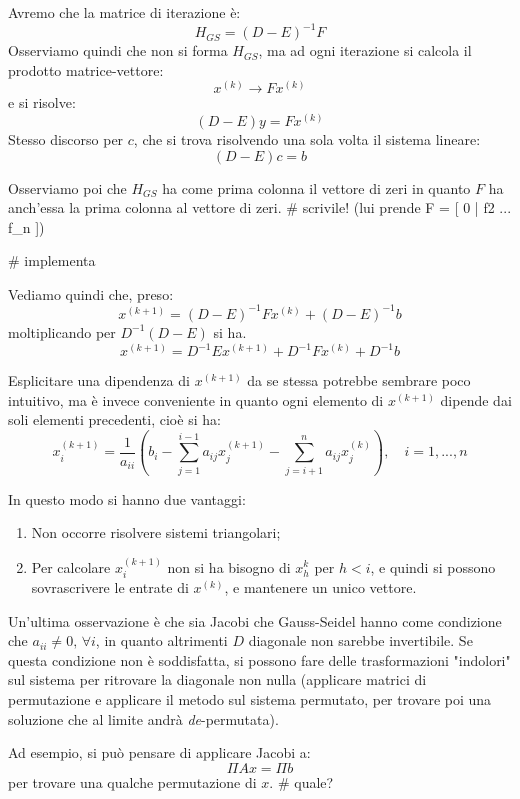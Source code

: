 \documentclass[a4paper,11pt]{article}
\begin{document}
Avremo che la matrice di iterazione è:
$$
H_{GS} = (D - E)^{-1} F
$$
Osserviamo quindi che non si forma $H_{GS}$, ma ad ogni iterazione si calcola il prodotto matrice-vettore:
$$
x^{(k)} \rightarrow F x^{(k)}
$$
e si risolve:
$$
(D - E) y = F x^{(k)}
$$
Stesso discorso per $c$, che si trova risolvendo una sola volta il sistema lineare:
$$
(D - E) c = b
$$

Osserviamo poi che $H_{GS}$ ha come prima colonna il vettore di zeri in quanto $F$ ha anch'essa la prima colonna al vettore di zeri. # scrivile! (lui prende F = [ 0 | f2 ... f_n ])

# implementa

Vediamo quindi che, preso:
$$
x^{(k + 1)} = (D - E)^{-1} F x^{(k)} + (D - E)^{-1} b
$$
moltiplicando per $D^{-1}(D - E)$ si ha.
$$
x^{(k + 1)} = D^{-1} E x^{(k + 1)} + D^{-1} F x^{(k)} + D^{-1} b
$$

Esplicitare una dipendenza di $x^{(k + 1)}$ da se stessa potrebbe sembrare poco intuitivo,
ma è invece conveniente in quanto ogni elemento di $x^{(k + 1)}$ dipende dai soli elementi precedenti, cioè si ha:
$$
x_i^{(k + 1)} = \frac{1}{a_{ii}} \left( b_i - \sum_{j = 1}^{i - 1} a_{ij} x_j^{(k + 1)} - \sum_{j = i + 1}^n a_{ij} x_j^{(k)} \right), \quad i = 1, ..., n
$$

In questo modo si hanno due vantaggi:
\begin{enumerate}
	\item Non occorre risolvere sistemi triangolari;
	\item Per calcolare $x_i^{(k + 1)}$ non si ha bisogno di $x_h^{k}$ per $h < i$, e quindi si possono sovrascrivere le entrate di $x^{(k)}$, e mantenere un unico vettore.
\end{enumerate}

\par\medskip

Un'ultima osservazione è che sia Jacobi che Gauss-Seidel hanno come condizione che $a_{ii} \neq 0, \, \forall i$, in quanto altrimenti $D$ diagonale non sarebbe invertibile.
Se questa condizione non è soddisfatta, si possono fare delle trasformazioni "indolori" sul sistema per ritrovare la diagonale non nulla (applicare matrici di permutazione e applicare il metodo sul sistema permutato, per trovare poi una soluzione che al limite andrà \textit{de}-permutata).

Ad esempio, si può pensare di applicare Jacobi a:
$$
\Pi A x = \Pi b
$$
per trovare una qualche permutazione di $x$. # quale?
\end{document}

